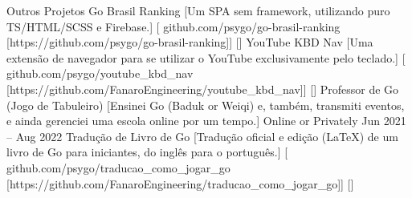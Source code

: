 \documentclass{llresume}
\begin{document}
\begin{mainpane}
    \begin{mainsection}{Outros Projetos}
        \entryGeneric
            {Go Brasil Ranking}
            [Um SPA sem framework, utilizando puro TS/HTML/SCSS e Firebase.]
            [\infoGithub
                {github.com/psygo/go-brasil-ranking}
                [https://github.com/psygo/go-brasil-ranking]]
            []
        \entryGeneric
            {YouTube KBD Nav}
            [Uma extensão de navegador para se utilizar o YouTube exclusivamente pelo teclado.]
            [\infoGithub
                {github.com/psygo/youtube\_kbd\_nav}
                [https://github.com/FanaroEngineering/youtube\_kbd\_nav]]
            []
        \entryJob
            {Professor de Go (Jogo de Tabuleiro)}
            [Ensinei Go (Baduk or Weiqi) e, também, transmiti eventos, e ainda  gerenciei uma escola online por um tempo.]
            {Online or Privately}
            {Jun 2021 -- Aug 2022}
        \entryGeneric
            {Tradução de Livro de Go}
            [Tradução oficial e edição (\LaTeX) de um livro de Go para iniciantes, do inglês para o português.]
            [\infoGithub
                {github.com/psygo/traducao\_como\_jogar\_go}
                [https://github.com/FanaroEngineering/traducao\_como\_jogar\_go]]
            []
    \end{mainsection}
\end{mainpane}
\end{document}
